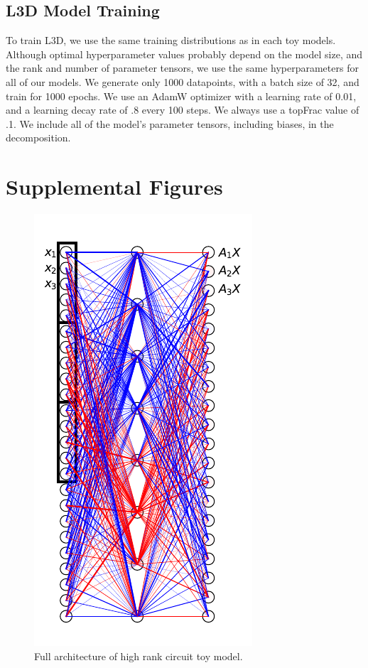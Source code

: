 \documentclass{article}
\theoremstyle{plain}
\theoremstyle{definition}
\theoremstyle{remark}
\begin{document}
\subsection{L3D Model Training}\label{sec:L3D_hyperparams}

To train L3D, we use the same training distributions as in each toy models. Although optimal hyperparameter values probably depend on the model size, and the rank and number of parameter tensors, we use the same hyperparameters for all of our models. We generate only 1000 datapoints, with a batch size of 32, and train for 1000 epochs. We use an AdamW optimizer with a learning rate of 0.01, and a learning decay rate of .8 every 100 steps. We always use a topFrac value of .1.  We include all of the model's parameter tensors, including biases, in the decomposition. 

\section{Supplemental Figures}


\begin{figure}[ht]
    \centerline{\includegraphics{../figures/s1_high_rank_circuit_setup.pdf}}
    \centering
    \caption{Full architecture of high rank circuit toy model.}\label{fig:s1_high_rank_circuit_setup}
\end{figure}
\end{document}
